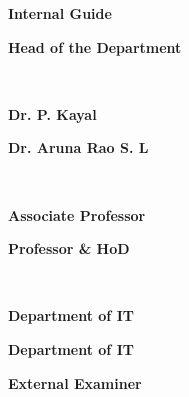 \documentclass[12pt, English]{article}
\begin{document}
\begin{titlepage}
\noindent 
{\begin{normalsize}
{\textbf{Internal Guide}}
\end{normalsize}
}
\hfill 
{
\begin{normalsize}
\textbf{ Head of the Department}
\end{normalsize}
}\\
\noindent 
{\begin{normalsize}
{\textbf{Dr. P. Kayal }}
\end{normalsize}
}
\hfill 
{
\begin{normalsize}
\textbf{Dr. Aruna Rao S. L}
\end{normalsize}
}\\
\noindent
{\begin{normalsize}
{\textbf{Associate Professor}}
\end{normalsize}
}
\hfill {
\begin{normalsize}
\textbf{Professor \& HoD }
\end{normalsize}
}\\
\noindent 
{\begin{normalsize}
{\textbf{Department of IT}}
\end{normalsize}
}
\hfill
{
\begin{normalsize}
{\textbf{Department of IT}}
\end{normalsize}
}

\vspace{0.5in}
\noindent 
{\begin{center}
{\textbf {External Examiner}}
\end{center}
}

\end{titlepage}
\end{document}
